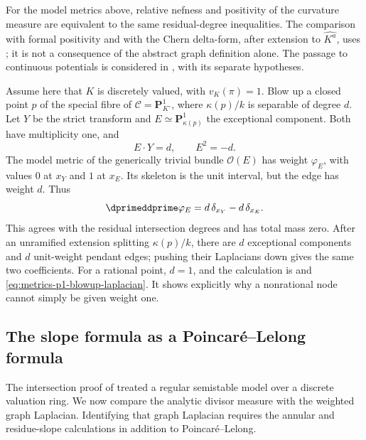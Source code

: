 \begin{remark}
\label{rem:ch19-curve-finite-test}
For the model metrics above, relative nefness and positivity of the
curvature measure are equivalent to the same residual-degree
inequalities.  The comparison with formal positivity and with the
Chern delta-form, after extension to $\widehat{K^a}$, uses
;
it is not a consequence of the abstract graph definition alone.
The passage to continuous potentials is considered in
, with its separate hypotheses.
\end{remark}

\begin{example}
\label{ex:ch19-blowup-residue-degree}
Assume here that $K$ is discretely valued, with $v_K(\pi)=1$.
Blow up a closed point $p$ of the special fibre of
$\mathcal C=\mathbf P^1_{K^\circ}$, where $\kappa(p)/k$ is
separable of degree $d$.  Let $Y$ be the strict transform and
$E\simeq\mathbf P^1_{\kappa(p)}$ the exceptional component.
Both have multiplicity one, and
\[
                          E\cdot Y=d,\qquad E^2=-d .
\]
The model metric of the generically trivial bundle $\mathcal O(E)$
has weight $\varphi_E$, with values $0$ at $x_Y$ and $1$ at $x_E$.
Its skeleton is the unit interval, but the edge has weight $d$.
Thus
\begin{equation}
\label{eq:exceptional-model-laplacian}
                   \dprimeddprime\varphi_E
                           =d\,\delta_{x_Y}-d\,\delta_{x_E}.
\end{equation}
This agrees with the residual intersection degrees and has total
mass zero.  After an unramified extension splitting $\kappa(p)/k$,
there are $d$ exceptional components and $d$ unit-weight pendant
edges; pushing their Laplacians down gives the same two coefficients.
For a rational point, $d=1$, and the calculation is
 and
\eqref{eq:metrics-p1-blowup-laplacian}.
It shows explicitly why a nonrational node cannot simply be given
weight one.
\end{example}

\subsection{The slope formula as a Poincar\'e--Lelong formula}
\label{sec:ch19-slope}

The intersection proof of  treated a
regular semistable model over a discrete valuation ring.  We now
compare the analytic divisor measure with the weighted graph
Laplacian.  Identifying that graph Laplacian requires the annular
and residue-slope calculations in addition to Poincar\'e--Lelong.

